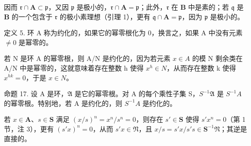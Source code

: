 因而 \(\mathfrak{r} \cap \mathbf{A} \subset \mathfrak{p}\)，又因 \(\mathfrak{p}\) 是极小的，\(\mathfrak{r} \cap \mathbf{A} = \mathfrak{p}\)；此外，\(\mathfrak{r}\) 在 \(\mathbf{B}\) 中是素的；若 \(\mathfrak{q}\) 是 \(\mathbf{B}\) 的一个包含于 \(\mathfrak{r}\) 的极小素理想（引理 1），更有 \(\mathfrak{q} \cap \mathbf{A} = \mathfrak{p}\)，因为 \(\mathfrak{p}\) 是极小的。

定义 5. 环 A 称为约化的，如果它的幂零根化为 0，换言之，如果 A 中没有元素 \(\neq 0\) 是幂零的。

若 N 是环 A 的幂零根，则 A/N 是约化的，因为若元素 \(x \in A\) 的模 N 剩余类在 A/N 中是幂零的，这就意味着存在整数 h 使得 \(x^{h} \in N\)，从而存在整数 k 使得 \(x^{hk} = 0\)，于是 \(x \in N\)。

命题 17. 设 A 是环，\(\mathfrak{A}\) 是它的幂零根。对 A 的每个乘性子集 S，\(S^{-1}\mathfrak{A}\) 是 \(S^{-1}A\) 的幂零根。特别地，若 A 是约化的，则 \(S^{-1}A\) 是约化的。

若 \(x \in \mathbf{A}\)、\(s \in \mathbf{S}\) 满足 \((x / s)^n = x^n / s^n = 0\)，则存在 \(s' \in \mathbf{S}\) 使得 \(s' x^n = 0\)（第 1 节，注 3），更有 \((s' x)^n = 0\)，从而 \(s' x \in \mathfrak{N}\)，且 \(x / s = s' x / s' s \in \mathbf{S}^{-1} \mathfrak{N}\)；其逆是直接的。

